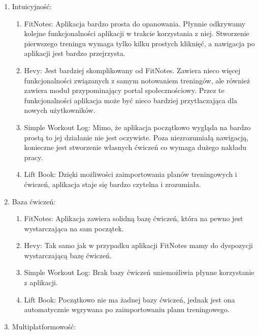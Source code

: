 \documentclass{article}
\begin{document}
                  \begin{enumerate}
                        \item Intuicyjność:
                              \begin{enumerate}
                                    \item FitNotes: Aplikacja bardzo prosta do opanowania. Płynnie odkrywamy kolejne funkcjonalności aplikacji w trakcie korzystania z niej. Stworzenie pierwszego treningu wymaga tylko kilku prostych kliknięć, a nawigacja po aplikacji jest bardzo przejrzysta.
                                    \item Hevy: Jest bardziej skomplikowany od FitNotes. Zawiera nieco więcej funkcjonalności związanych z samym notowaniem treningów, ale również zawiera moduł przypominający portal społecznościowy. Przez te funkcjonalności aplikacja może być nieco bardziej przytłaczająca dla nowych użytkowników.
                                    \item Simple Workout Log: Mimo, że aplikacja początkowo wygląda na bardzo prostą to jej działanie nie jest oczywiste. Poza niezrozumiałą nawigacją, konieczne jest stworzenie własnych ćwiczeń co wymaga dużego nakładu pracy. 
                                    \item Lift Book: Dzięki możliwości zaimportowania planów treningowych i ćwiczeń, aplikacja staje się bardzo czytelna i zrozumiała.
                              \end{enumerate}
                        \item Baza ćwiczeń: 
                              \begin{enumerate}
                                    \item FitNotes: Aplikacja zawiera solidną bazę ćwiczeń, która na pewno jest wystarczająca na sam początek.
                                    \item Hevy: Tak samo jak w przypadku aplikacji FitNotes mamy do dyspozycji wystarczającą bazę ćwiczeń.
                                    \item Simple Workout Log: Brak bazy ćwiczeń uniemożliwia płynne korzystanie z aplikacji.
                                    \item Lift Book: Początkowo nie ma żadnej bazy ćwiczeń, jednak jest ona automatycznie wgrywana po zaimportowaniu planu treningowego.
                              \end{enumerate}
                        \item Multiplatformowość: 

\end{enumerate}
\end{document}
